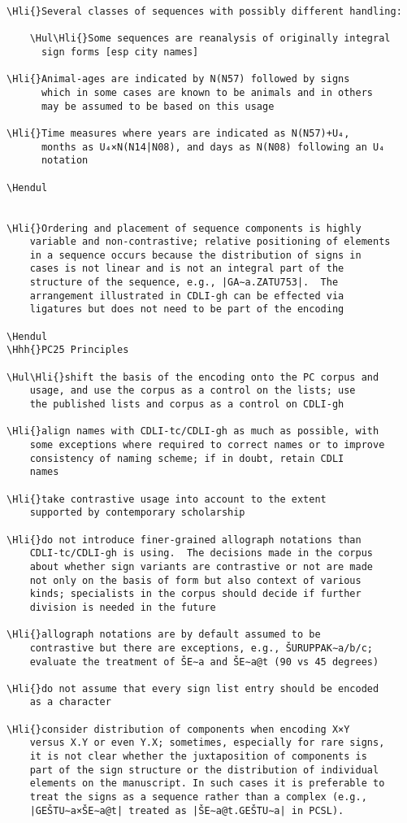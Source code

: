 \begin{verbatim}
\Hli{}Several classes of sequences with possibly different handling:

	\Hul\Hli{}Some sequences are reanalysis of originally integral
	  sign forms [esp city names]

\Hli{}Animal-ages are indicated by N(N57) followed by signs
   	  which in some cases are known to be animals and in others
   	  may be assumed to be based on this usage

\Hli{}Time measures where years are indicated as N(N57)+U₄,
  	  months as U₄×N(N14|N08), and days as N(N08) following an U₄
  	  notation

\Hendul


\Hli{}Ordering and placement of sequence components is highly
	variable and non-contrastive; relative positioning of elements
	in a sequence occurs because the distribution of signs in
	cases is not linear and is not an integral part of the
	structure of the sequence, e.g., |GA∼a.ZATU753|.  The
	arrangement illustrated in CDLI-gh can be effected via
	ligatures but does not need to be part of the encoding

\Hendul
\Hhh{}PC25 Principles

\Hul\Hli{}shift the basis of the encoding onto the PC corpus and
 	usage, and use the corpus as a control on the lists; use
 	the published lists and corpus as a control on CDLI-gh

\Hli{}align names with CDLI-tc/CDLI-gh as much as possible, with
	some exceptions where required to correct names or to improve
	consistency of naming scheme; if in doubt, retain CDLI
	names

\Hli{}take contrastive usage into account to the extent
   	supported by contemporary scholarship

\Hli{}do not introduce finer-grained allograph notations than
	CDLI-tc/CDLI-gh is using.  The decisions made in the corpus
	about whether sign variants are contrastive or not are made
	not only on the basis of form but also context of various
	kinds; specialists in the corpus should decide if further
	division is needed in the future

\Hli{}allograph notations are by default assumed to be
	contrastive but there are exceptions, e.g., ŠURUPPAK∼a/b/c;
	evaluate the treatment of ŠE∼a and ŠE∼a@t (90 vs 45 degrees)

\Hli{}do not assume that every sign list entry should be encoded
   	as a character

\Hli{}consider distribution of components when encoding X×Y
	versus X.Y or even Y.X; sometimes, especially for rare signs,
	it is not clear whether the juxtaposition of components is
	part of the sign structure or the distribution of individual
	elements on the manuscript. In such cases it is preferable to
	treat the signs as a sequence rather than a complex (e.g.,
	|GEŠTU∼a×ŠE∼a@t| treated as |ŠE∼a@t.GEŠTU∼a| in PCSL).


\end{verbatim}
